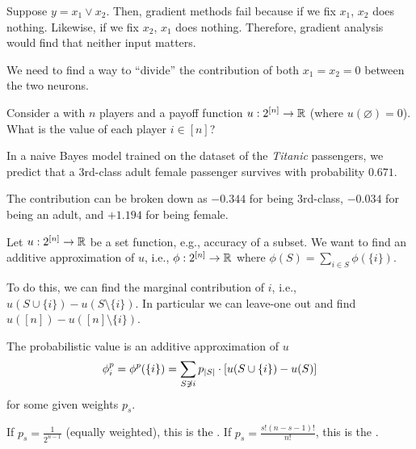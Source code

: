 \documentclass[class=cs480,notes,tikz]{agony}
\begin{document}
Suppose $y = x_1 \lor x_2$.
Then, gradient methods fail because if we fix $x_1$, $x_2$ does nothing.
Likewise, if we fix $x_2$, $x_1$ does nothing.
Therefore, gradient analysis would find that neither input matters.

We need to find a way to ``divide'' the contribution of both $x_1 = x_2 = 0$
between the two neurons.

\begin{problem}
  Consider a  with $n$ players
  and a payoff function $u : 2^{[n]} \to \mathbb{R}$ (where $u(\varnothing) = 0$).
  What is the value of each player $i \in [n]$?
\end{problem}

\begin{example}
  In a naive Bayes model trained on the dataset of the \emph{Titanic} passengers,
  we predict that a 3rd-class adult female passenger survives with probability $0.671$.

  The contribution can be broken down as $-0.344$ for being 3rd-class,
  $-0.034$ for being an adult, and $+1.194$ for being female.
\end{example}

Let $u : 2^{[n]} \to \mathbb{R}$ be a set function, e.g., accuracy of a subset.
We want to find an additive approximation of $u$, i.e.,
$\phi : 2^{[n]} \to \mathbb{R}$ where $\phi(S) = \sum_{i\in S}\phi(\{i\})$.

To do this, we can find the marginal contribution of $i$, i.e.,
$u(S \cup \{i\}) - u(S \setminus \{i\})$.
In particular we can leave-one out and find $u([n]) - u([n] \setminus \{i\})$.

\begin{defn}
  The probabilistic value is an additive approximation of $u$
  \[ \phi_i^p = \phi^p(\{i\}) = \sum_{S \not\ni i} p_{\abs{S}} \cdot [u(S \cup \{i\}) - u(S)] \]
  for some given weights $p_s$.

  If $p_s = \frac{1}{2^{n-1}}$ (equally weighted), this is the .
  If $p_s = \frac{s!(n-s-1)!}{n!}$, this is the .
\end{defn}
\end{document}

